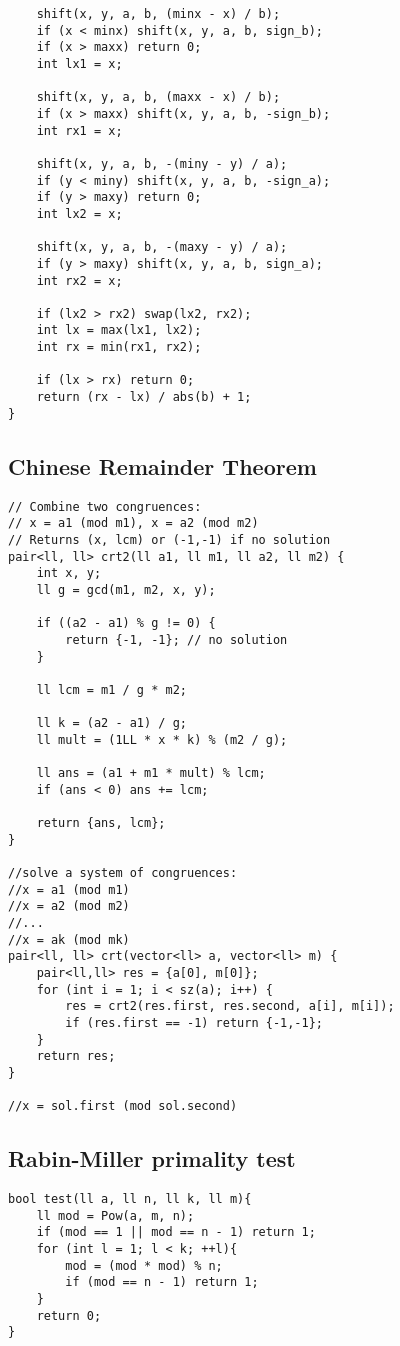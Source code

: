 \documentclass[11pt,a4paper]{article}
\begin{document}
\begin{multicols*}{2}
\begin{lstlisting}
    shift(x, y, a, b, (minx - x) / b);
    if (x < minx) shift(x, y, a, b, sign_b);
    if (x > maxx) return 0;
    int lx1 = x;

    shift(x, y, a, b, (maxx - x) / b);
    if (x > maxx) shift(x, y, a, b, -sign_b);
    int rx1 = x;

    shift(x, y, a, b, -(miny - y) / a);
    if (y < miny) shift(x, y, a, b, -sign_a);
    if (y > maxy) return 0;
    int lx2 = x;

    shift(x, y, a, b, -(maxy - y) / a);
    if (y > maxy) shift(x, y, a, b, sign_a);
    int rx2 = x;

    if (lx2 > rx2) swap(lx2, rx2);
    int lx = max(lx1, lx2);
    int rx = min(rx1, rx2);

    if (lx > rx) return 0;
    return (rx - lx) / abs(b) + 1;
}
\end{lstlisting}

\subsection{Chinese Remainder Theorem}
\begin{lstlisting}
// Combine two congruences: 
// x = a1 (mod m1), x = a2 (mod m2)
// Returns (x, lcm) or (-1,-1) if no solution
pair<ll, ll> crt2(ll a1, ll m1, ll a2, ll m2) {
    int x, y;
    ll g = gcd(m1, m2, x, y);

    if ((a2 - a1) % g != 0) {
        return {-1, -1}; // no solution
    }

    ll lcm = m1 / g * m2;

    ll k = (a2 - a1) / g;
    ll mult = (1LL * x * k) % (m2 / g);

    ll ans = (a1 + m1 * mult) % lcm;
    if (ans < 0) ans += lcm;

    return {ans, lcm};
}

//solve a system of congruences:
//x = a1 (mod m1)
//x = a2 (mod m2)
//...
//x = ak (mod mk)
pair<ll, ll> crt(vector<ll> a, vector<ll> m) {
    pair<ll,ll> res = {a[0], m[0]};
    for (int i = 1; i < sz(a); i++) {
        res = crt2(res.first, res.second, a[i], m[i]);
        if (res.first == -1) return {-1,-1};
    }
    return res;
}

//x = sol.first (mod sol.second)
\end{lstlisting}

\subsection{Rabin-Miller primality test}
\begin{lstlisting}
bool test(ll a, ll n, ll k, ll m){
    ll mod = Pow(a, m, n);
    if (mod == 1 || mod == n - 1) return 1;
    for (int l = 1; l < k; ++l){
        mod = (mod * mod) % n;
        if (mod == n - 1) return 1;
    }
    return 0;
}


\end{lstlisting}
\end{multicols*}
\end{document}
